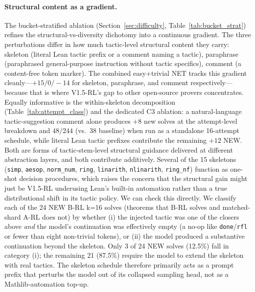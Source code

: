\documentclass{article}
\begin{document}
\paragraph{Structural content as a gradient.}
The bucket-stratified ablation (Section~\ref{sec:difficulty}, Table~\ref{tab:bucket_strat}) refines the structural-vs-diversity dichotomy into a continuous gradient. The three perturbations differ in how much tactic-level structural content they carry: skeleton (literal Lean tactic prefix or a comment naming a tactic), paraphrase (paraphrased general-purpose instruction without tactic specifics), comment (a content-free token marker). The combined easy+trivial NET tracks this gradient cleanly---$+15 / 0 / -14$ for skeleton, paraphrase, and comment respectively---because that is where V1.5-RL's gap to other open-source provers concentrates. Equally informative is the within-skeleton decomposition (Table~\ref{tab:attempt_class}) and the dedicated C3 ablation: a natural-language tactic-suggestion comment alone produces $+8$ new solves at the attempt-level breakdown and $48/244$ (vs.\ $38$ baseline) when run as a standalone 16-attempt schedule, while literal Lean tactic prefixes contribute the remaining $+12$ NEW. Both are forms of tactic-stem-level structural guidance delivered at different abstraction layers, and both contribute additively. Several of the 15 skeletons (\texttt{simp}, \texttt{aesop}, \texttt{norm\_num}, \texttt{ring}, \texttt{linarith}, \texttt{nlinarith}, \texttt{ring\_nf}) function as one-shot decision procedures, which raises the concern that the structural gain might just be V1.5-RL underusing Lean's built-in automation rather than a true distributional shift in its tactic policy. We can check this directly. We classify each of the 24 NEW B-RL k=16 solves (theorems that B-RL solves and matched-shard A-RL does not) by whether (i) the injected tactic was one of the closers above \emph{and} the model's continuation was effectively empty (a no-op like \texttt{done}/\texttt{rfl} or fewer than eight non-trivial tokens), or (ii) the model produced a substantive continuation beyond the skeleton. Only 3 of 24 NEW solves (12.5\%) fall in category (i); the remaining 21 (87.5\%) require the model to extend the skeleton with real tactics. The skeleton schedule therefore primarily acts as a prompt prefix that perturbs the model out of its collapsed sampling head, not as a Mathlib-automation top-up.
\end{document}
